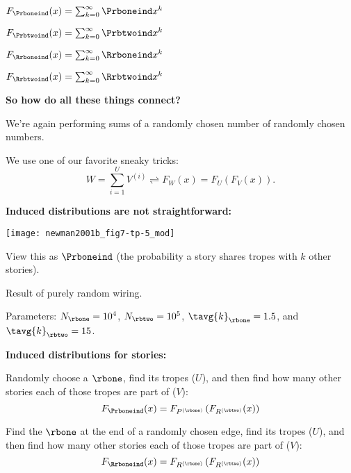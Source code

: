     
      $
      F_{\Prboneind}(x)
      =
      \sum_{k=0}^{\infty}
      \Prboneind x^k
      $
    
      $
      F_{\Prbtwoind}(x)
      =
      \sum_{k=0}^{\infty}
      \Prbtwoind x^k
      $
    
      $
      F_{\Rrboneind}(x)
      =
      \sum_{k=0}^{\infty}
      \Rrboneind x^k
      $
    
      $
      F_{\Rrbtwoind}(x)
      =
      \sum_{k=0}^{\infty}
      \Rrbtwoind x^k
      $
    
  

  \textbf{So how do all these things connect?}
    
    
      We're again performing sums of a randomly chosen number
      of randomly chosen numbers.
    
      We use one of our favorite sneaky tricks:
      $$
      W 
      = 
      \sum_{i=1}^{U} V^{(i)}
      \rightleftharpoons
      F_W(x)
      =
      F_U(F_V(x)).
      $$
    
  


  \textbf{Induced distributions are not straightforward:}
    \begin{center}
      \texttt{[image: newman2001b\_fig7-tp-5\_mod]}
    \end{center}
    
     
      View this as $\Prboneind$ (the probability a story shares tropes
      with $k$ other stories).\cite{newman2001b}
     
      Result of purely random wiring.
     
      Parameters: 
      $N_\rbone = 10^4$,
      $N_\rbtwo = 10^5$,\newline
      $\tavg{k}_\rbone = 1.5$,
      and
      $\tavg{k}_\rbtwo = 15$.
    
  
  


  \textbf{Induced distributions for stories:}
    
    
      Randomly choose a $\rbone$, find its tropes ($U$),
      and then find how many other stories each of those tropes 
      are part of ($V$):
      $$
      F_{\Prboneind}(x)
      =
      F_{P^{(\rbone)}}
      \left(
        F_{R^{(\rbtwo)}}(x)      
      \right)
      $$
    
      Find the $\rbone$ at the end of a randomly chosen edge, find its tropes ($U$),
      and then find how many other stories each of those tropes 
      are part of ($V$):
      $$
      F_{\Rrboneind}(x)
      =
      F_{R^{(\rbone)}}
      \left(
        F_{R^{(\rbtwo)}}(x)      
      \right)
      $$
    
